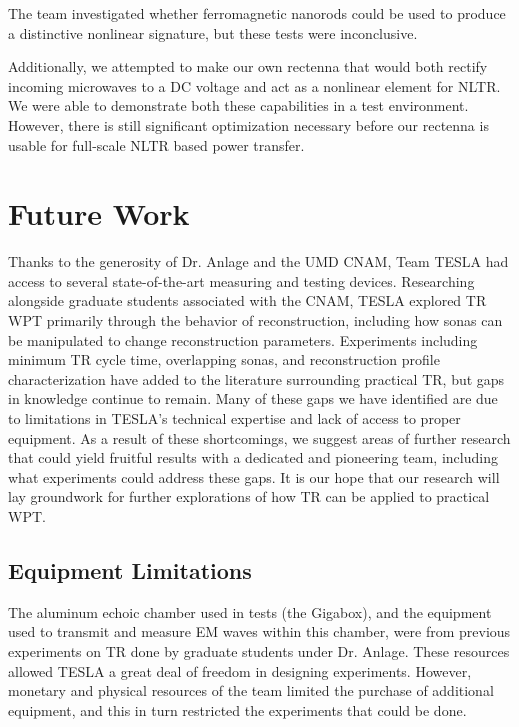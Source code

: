 The team investigated whether ferromagnetic nanorods could be used to produce a distinctive nonlinear signature, but these tests were inconclusive. 

Additionally, we attempted to make our own rectenna that would both rectify incoming microwaves to a DC voltage and act as a nonlinear element for NLTR. We were able to demonstrate both these capabilities in a test environment. However, there is still significant optimization necessary before our rectenna is usable for full-scale NLTR based power transfer.


\section{Future Work}

Thanks to the generosity of Dr. Anlage and the UMD CNAM, Team TESLA had access to several state-of-the-art measuring and testing devices. Researching alongside graduate students associated with the CNAM, TESLA explored TR WPT primarily through the behavior of reconstruction, including how sonas can be manipulated to change reconstruction parameters.  Experiments including minimum TR cycle time, overlapping sonas, and reconstruction profile characterization have added to the literature surrounding practical TR, but gaps in knowledge continue to remain.  Many of these gaps we have identified are due to limitations in TESLA's technical expertise and lack of  access to proper equipment.  As a result of these shortcomings, we suggest areas of further research that could yield fruitful results with a dedicated and pioneering team, including what experiments could address these gaps.  It is our hope that our research will lay groundwork for further explorations of how TR can be applied to practical WPT.

\subsection{Equipment Limitations}

The aluminum echoic chamber used in tests (the Gigabox), and the equipment used to transmit and measure EM waves within this chamber, were from previous experiments on TR done by graduate students under Dr. Anlage.  These resources allowed TESLA a great deal of freedom in designing experiments.  However, monetary and physical resources of the team limited the purchase of additional equipment, and this in turn restricted the experiments that could be done.

